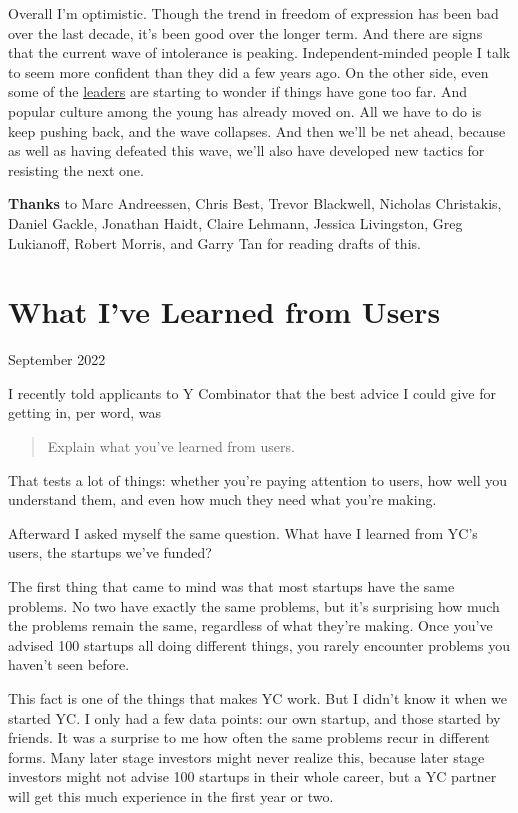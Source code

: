 \documentclass[12pt]{book}
\begin{document}
Overall I'm optimistic. Though the trend in freedom of expression has
been bad over the last decade, it's been good over the longer term. And
there are signs that the current wave of intolerance is peaking.
Independent-minded people I talk to seem more confident than they did a
few years ago. On the other side, even some of the
\href{https://www.nytimes.com/2022/03/18/opinion/cancel-culture-free-speech-poll.html}{leaders}
are starting to wonder if things have gone too far. And popular culture
among the young has already moved on. All we have to do is keep pushing
back, and the wave collapses. And then we'll be net ahead, because as
well as having defeated this wave, we'll also have developed new tactics
for resisting the next one.


\textbf{Thanks} to Marc Andreessen, Chris Best, Trevor Blackwell,
Nicholas Christakis, Daniel Gackle, Jonathan Haidt, Claire Lehmann,
Jessica Livingston, Greg Lukianoff, Robert Morris, and Garry Tan for
reading drafts of this.
\chapter{What I've Learned from Users}

September 2022

I recently told applicants to Y Combinator that the best advice I could
give for getting in, per word, was

\begin{quote}
Explain what you've learned from users.
\end{quote}

That tests a lot of things: whether you're paying attention to users,
how well you understand them, and even how much they need what you're
making.

Afterward I asked myself the same question. What have I learned from
YC's users, the startups we've funded?

The first thing that came to mind was that most startups have the same
problems. No two have exactly the same problems, but it's surprising how
much the problems remain the same, regardless of what they're making.
Once you've advised 100 startups all doing different things, you rarely
encounter problems you haven't seen before.

This fact is one of the things that makes YC work. But I didn't know it
when we started YC. I only had a few data points: our own startup, and
those started by friends. It was a surprise to me how often the same
problems recur in different forms. Many later stage investors might
never realize this, because later stage investors might not advise 100
startups in their whole career, but a YC partner will get this much
experience in the first year or two.
\end{document}
